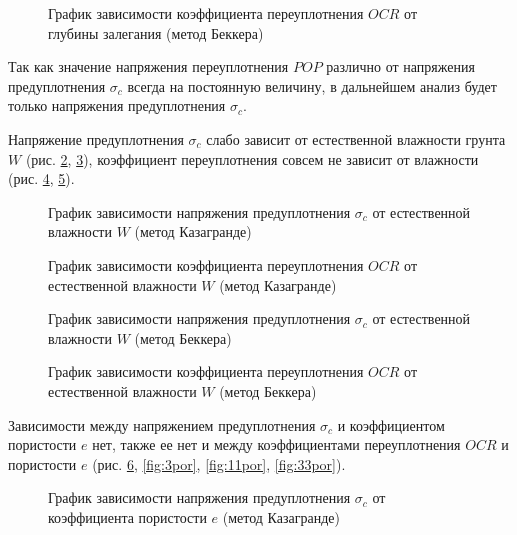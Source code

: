 \begin{figure}[h!]
  \caption{График зависимости коэффициента переуплотнения $OCR$ от глубины залегания (метод Беккера)}\label{fig:33gl}
\end{figure}

Так как значение напряжения переуплотнения $POP$
различно от напряжения предуплотнения $\sigma_c$ 
всегда на постоянную величину, в дальнейшем 
анализ будет только напряжения предуплотнения $\sigma_c$.

Напряжение предуплотнения $\sigma_c$ слабо 
зависит от естественной влажности грунта $W$ (рис. \ref{fig:1vl}, \ref{fig:3vl}), 
коэффициент переуплотнения совсем не зависит от 
влажности (рис. \ref{fig:11vl}, \ref{fig:33vl}).

\begin{figure}[h!]
  \caption{График зависимости напряжения предуплотнения $\sigma_c$ от естественной 
  влажности $W$ (метод Казагранде)}\label{fig:1vl}
\end{figure}

\begin{figure}[h!]
  \caption{График зависимости коэффициента переуплотнения $OCR$ от 
  естественной 
  влажности $W$ (метод Казагранде)}\label{fig:3vl}
\end{figure}

\begin{figure}[h!]
  \caption{График зависимости напряжения предуплотнения $\sigma_c$ от 
  естественной 
  влажности $W$ (метод Беккера)}\label{fig:11vl}
\end{figure}

\begin{figure}[h!]
  \caption{График зависимости коэффициента переуплотнения $OCR$ от 
  естественной 
  влажности $W$ (метод Беккера)}\label{fig:33vl}
\end{figure}

Зависимости между напряжением предуплотнения $\sigma_c$ 
и коэффициентом пористости $e$ нет, также 
ее нет и между коэффициентами переуплотнения $OCR$ и пористости $e$ (рис. \ref{fig:1por}, \ref{fig:3por}, \ref{fig:11por}, \ref{fig:33por}).

\begin{figure}[h!]
  \caption{График зависимости напряжения предуплотнения $\sigma_c$ от коэффициента пористости $e$ (метод Казагранде)}\label{fig:1por}
\end{figure}


